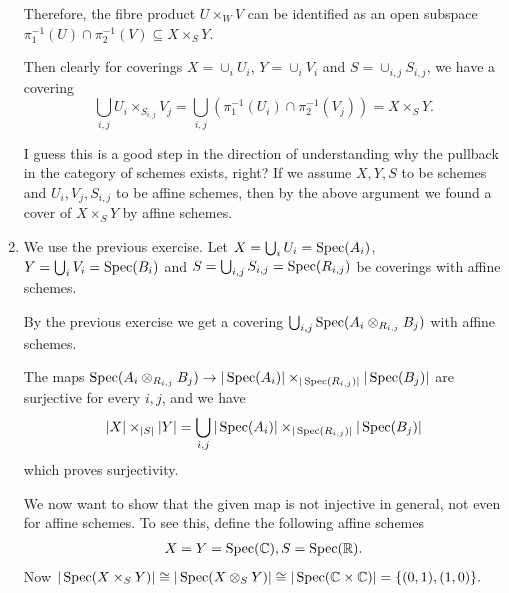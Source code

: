 \begin{exercise}{1}
\begin{enumerate}
{            %

            Therefore, the fibre product $U \times_W V$ can be identified as an
            open subspace $\pi^{-1}_1(U) \cap \pi^{-1}_2(V) \subseteq X \times_S
            Y$.

            Then clearly for coverings $X = \cup_i U_i$, $Y = \cup_i V_i$ and $S =
            \cup_{i, j} S_{i, j}$, we have a covering
            \begin{equation*}
                \bigcup_{i, j} U_i \times_{S_{i, j}} V_j = \bigcup_{i, j}
                (\pi^{-1}_1(U_i) \cap \pi^{-1}_2(V_j)) = X \times_S Y.
            \end{equation*}

            I guess this is a good step in the direction of understanding why
            the pullback in the category of schemes exists, right? If we assume
            $X, Y, S$ to be schemes and $U_i, V_j, S_{i,j}$ to be affine
            schemes, then by the above argument we found a cover of $X\times_S
            Y$ by affine schemes.
            }
        \item{
            We use the previous exercise. Let $X = \bigcup_i U_i = \operatorname{Spec}(A_i)$,
            $Y = \bigcup_i V_i = \operatorname{Spec}(B_i)$ and $S = \bigcup_{i, j} S_{i, j} =
            \operatorname{Spec}(R_{i, j})$ be coverings with affine schemes.

            By the previous exercise we get a covering $\bigcup_{i, j} \operatorname{Spec}(A_i
            \otimes_{R_{i, j}} B_j)$ with affine schemes.
            
            The maps $\operatorname{Spec}(A_i \otimes_{R_{i, j}} B_j) \to |\operatorname{Spec}(A_i)|
            \times_{|\operatorname{Spec}(R_{i, j})|} |\operatorname{Spec}(B_j)|$ are surjective for every
            $i, j$, and we have
            \begin{equation*}
                |X| \times_{|S|} |Y| = \bigcup_{i, j} |\operatorname{Spec}(A_i)|
                \times_{|\operatorname{Spec}(R_{i, j})|} |\operatorname{Spec}(B_j)|
            \end{equation*}
            which proves surjectivity.

            We now want to show that the given map is not injective in general,
            not even for affine schemes. To see this, define the following
            affine schemes
            \begin{align*}
                X=Y=\operatorname{Spec}(\mathbb{C}), S=\operatorname{Spec}(\mathbb{R}).
            \end{align*}
            Now $| \operatorname{Spec}(X\times_S Y)| \cong | \operatorname{Spec}(X\otimes_S Y)| \cong
            |\operatorname{Spec}(\mathbb{C}\times \mathbb{C})|=\lbrace(0,1),(1,0)\rbrace.$

}
\end{enumerate}
\end{exercise}
